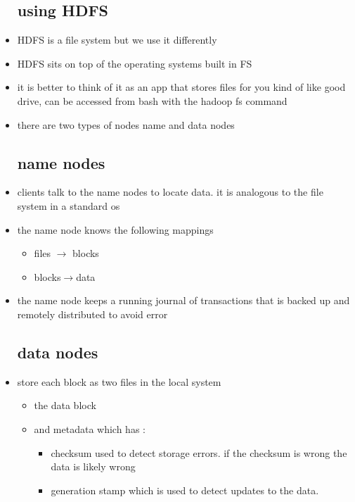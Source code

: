 \documentclass{article}
\begin{document}
\begin{itemize}
\subsection{using HDFS}
\item HDFS is a file system but we use it differently
\item HDFS sits on top of the operating systems built in FS
\item it is better to think of it as an app that stores files for you kind of like good drive, can be accessed from bash with the hadoop fs command 
\item there are two types of nodes name and data nodes
\subsection{name nodes}
\item clients talk to the name nodes to locate data. it is analogous to the file system in a standard os
\item the name node knows the following mappings 
\begin{itemize}
    \item files $\rightarrow$ blocks
    \item blocks$\rightarrow $data
\end{itemize}
\item the name node keeps a running journal of transactions that is backed up and remotely distributed to avoid error
\subsection{data nodes}
\item store each block as two files in the local system 
\begin{itemize}
    \item the data block 
    \item and metadata which has :
    \begin{itemize}
        \item checksum used to detect storage errors. if the checksum is wrong the data is likely wrong  
        \item generation stamp which is used to detect updates to the data. 
    \end{itemize}
\end{itemize}


\end{itemize}
\end{document}
